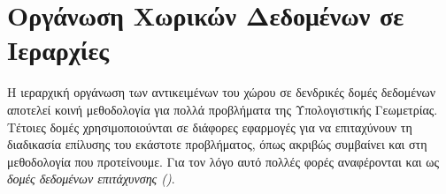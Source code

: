 
\section{Οργάνωση Χωρικών Δεδομένων σε Ιεραρχίες}
Η ιεραρχική οργάνωση των αντικειμένων του χώρου σε δενδρικές 
δομές δεδομένων αποτελεί κοινή μεθοδολογία για πολλά προβλήματα 
της Υπολογιστικής Γεωμετρίας. 
Τέτοιες δομές χρησιμοποιούνται σε διάφορες εφαρμογές για να 
επιταχύνουν τη διαδικασία επίλυσης του εκάστοτε προβλήματος, 
όπως ακριβώς συμβαίνει και στη μεθοδολογία που προτείνουμε. 
Για τον λόγο αυτό πολλές φορές αναφέρονται και ως \textit{δομές 
δεδομένων επιτάχυνσης ()}.

